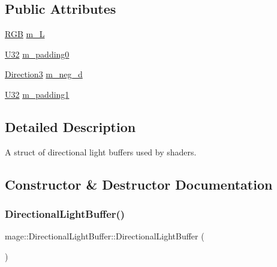 \subsection*{Public Attributes}
\begin{DoxyCompactItemize}
\item 
\hyperlink{structmage_1_1_r_g_b}{R\+GB} \hyperlink{structmage_1_1_directional_light_buffer_a9f7b75a474c2f28176aeb5207ff653dd}{m\+\_\+L}
\item 
\hyperlink{namespacemage_a41c104c036fba3756a74e19f793eeaa1}{U32} \hyperlink{structmage_1_1_directional_light_buffer_aac8d40f7af8eac8b2fb79085843be4fd}{m\+\_\+padding0}
\item 
\hyperlink{structmage_1_1_direction3}{Direction3} \hyperlink{structmage_1_1_directional_light_buffer_af3a1952cf82b66730868573a4b581ab4}{m\+\_\+neg\+\_\+d}
\item 
\hyperlink{namespacemage_a41c104c036fba3756a74e19f793eeaa1}{U32} \hyperlink{structmage_1_1_directional_light_buffer_ab94c0c42a54c9751dde8a4a2a84da861}{m\+\_\+padding1}
\end{DoxyCompactItemize}


\subsection{Detailed Description}
A struct of directional light buffers used by shaders. 

\subsection{Constructor \& Destructor Documentation}
\hypertarget{structmage_1_1_directional_light_buffer_a05efc80b9ce0ac27cdef9f1cd3241d70}{}\label{structmage_1_1_directional_light_buffer_a05efc80b9ce0ac27cdef9f1cd3241d70} 
\subsubsection{\texorpdfstring{Directional\+Light\+Buffer()}{DirectionalLightBuffer()}\hspace{0.1cm}{\footnotesize\ttfamily [1/3]}}
{\footnotesize\ttfamily mage\+::\+Directional\+Light\+Buffer\+::\+Directional\+Light\+Buffer (\begin{DoxyParamCaption}{ }\end{DoxyParamCaption})\hspace{0.3cm}{\ttfamily [noexcept]}}

